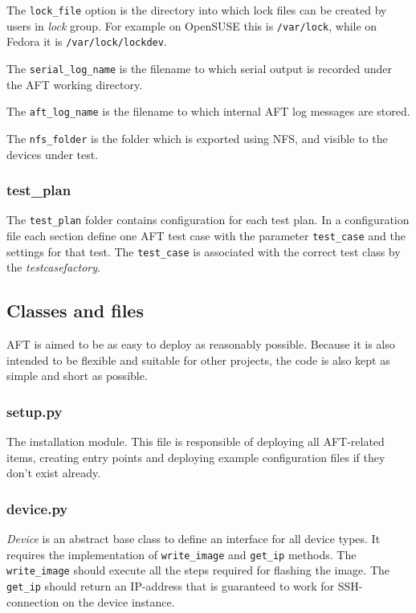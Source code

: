 \documentclass[a4paper,11pt]{article}
\newcommand{\cmd}[1]{\texttt{#1}}
\begin{document}
The \cmd{lock\_file} option is the directory into which lock files can be created by users in \emph{lock} group. For example on OpenSUSE this is \cmd{/var/lock}, while on Fedora it is \cmd{/var/lock/lockdev}.

The \cmd{serial\_log\_name} is the filename to which serial output is recorded under the AFT working directory.

The \cmd{aft\_log\_name} is the filename to which internal AFT log messages are stored.

The \cmd{nfs\_folder} is the folder which is exported using NFS, and visible to the devices under test.

\subsubsection*{test\_plan}
The \cmd{test\_plan} folder contains configuration for each test plan. In a configuration file each section define one AFT test case with the parameter \cmd{test\_case} and the settings for that test. The \cmd{test\_case} is associated with the correct test class by the \emph{testcasefactory}.

\subsection{Classes and files}

AFT is aimed to be as easy to deploy as reasonably possible. Because it is also intended to be flexible and suitable for other projects, the code is also kept as simple and short as possible.

\subsubsection*{setup.py}
The installation module. This file is responsible of deploying all AFT-related items, creating entry points and deploying example configuration files if they don't exist already.

\subsubsection*{device.py}
\emph{Device} is an abstract base class to define an interface for all device types. It requires the implementation of \cmd{write\_image} and \cmd{get\_ip} methods. The \cmd{write\_image} should execute all the steps required for flashing the image. The \cmd{get\_ip} should return an IP-address that is guaranteed to work for SSH-connection on the device instance.
\end{document}
